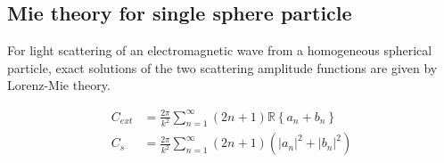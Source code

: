 




\subsection{Mie theory for single sphere particle}
For light scattering of an electromagnetic wave from a homogeneous spherical particle, exact solutions of the two scattering amplitude functions are given by Lorenz-Mie theory.

\begin{align}
    C_{ext} &= \frac{2\pi}{k^2}\sum_{n=1}^{\infty}(2n+1)\mathbb{R}\left\{a_n+b_n\right\} \\
    C_s &= \frac{2\pi}{k^2}\sum_{n=1}^{\infty}(2n+1)(|a_n|^2+|b_n|^2)
\end{align}
    

